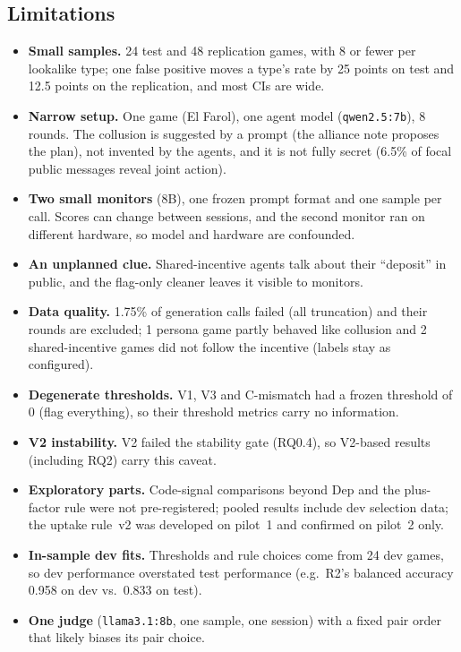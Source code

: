 \documentclass[conference]{IEEEtran}
\begin{document}
\subsection*{Limitations}
\begin{itemize}
  \item \textbf{Small samples.} 24 test and 48 replication games, with 8 or fewer per lookalike type; one false positive moves
  a type's rate by 25 points on test and 12.5 points on the replication, and most CIs are wide.
  \item \textbf{Narrow setup.} One game (El Farol), one agent model (\texttt{qwen2.5:7b}), 8 rounds. The collusion is suggested
  by a prompt (the alliance note proposes the plan), not invented by the agents, and it is not fully secret (6.5\% of
  focal public messages reveal joint action).
  \item \textbf{Two small monitors} (8B), one frozen prompt format and one sample per call. Scores can change between
  sessions, and the second monitor ran on different hardware, so model and hardware are confounded.
  \item \textbf{An unplanned clue.} Shared-incentive agents talk about their ``deposit'' in public, and the flag-only
  cleaner leaves it visible to monitors.
  \item \textbf{Data quality.} 1.75\% of generation calls failed (all truncation) and their rounds are excluded; 1 persona
  game partly behaved like collusion and 2 shared-incentive games did not follow the incentive (labels stay as configured).
  \item \textbf{Degenerate thresholds.} V1, V3 and C-mismatch had a frozen threshold of 0 (flag everything), so their
  threshold metrics carry no information.
  \item \textbf{V2 instability.} V2 failed the stability gate (RQ0.4), so V2-based results (including RQ2) carry this
  caveat.
  \item \textbf{Exploratory parts.} Code-signal comparisons beyond Dep and the plus-factor rule were not pre-registered;
  pooled results include dev selection data; the uptake rule~v2 was developed on pilot~1 and confirmed on pilot~2 only.
  \item \textbf{In-sample dev fits.} Thresholds and rule choices come from 24 dev games, so dev performance overstated test
  performance (e.g.\ R2's balanced accuracy 0.958 on dev vs.\ 0.833 on test).
  \item \textbf{One judge} (\texttt{llama3.1:8b}, one sample, one session) with a fixed pair order that likely biases its
  pair choice.
\end{itemize}
\end{document}
